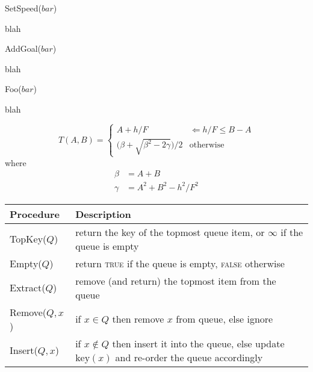 \documentclass[twocolumn]{article}
\newcommand{\key}{\text{key}}
\begin{document}
\begin{algorithm}
  \caption{SetSpeed($bar$)}
  \begin{algorithmic}
    \STATE blah
  \end{algorithmic}
\end{algorithm}

\begin{algorithm}
  \caption{AddGoal($bar$)}
  \begin{algorithmic}
    \STATE blah
  \end{algorithmic}
\end{algorithm}

\begin{algorithm}
  \caption{Foo($bar$)}
  \begin{algorithmic}
    \STATE blah
  \end{algorithmic}
\end{algorithm}

\begin{equation}
  T(A,B) =
  \begin{cases}
    A + h/F                                & \Leftarrow h/F \leq B-A \\
    \big(\beta + \sqrt{\beta^2 - 2\gamma}\big) / 2 & \text{otherwise}
  \end{cases}
\end{equation}
\noindent where
\begin{subequations}
  \begin{align}
    \beta &= A + B \\
    \gamma &= A^2 + B^2 - h^2/F^2
  \end{align}
\end{subequations}

\begin{table}
  \centering
  \begin{tabular}{@{}p{}p{}@{}}
    \toprule
    Procedure & Description \\
    \midrule
    TopKey($Q$)    & return the key of the topmost queue item, or $\infty$ if the queue is empty \\
    Empty($Q$)     & return \textsc{true} if the queue is empty, \textsc{false} otherwise \\
    Extract($Q$)   & remove (and return) the topmost item from the queue \\
    Remove($Q, x$) & if $x\in Q$ then remove $x$ from queue, else ignore \\
    Insert($Q, x$) & if $x\notin Q$ then insert it into the queue, else update $\key(x)$ and re-order the queue accordingly \\
    \bottomrule
  \end{tabular}
\end{table}
\end{document}
